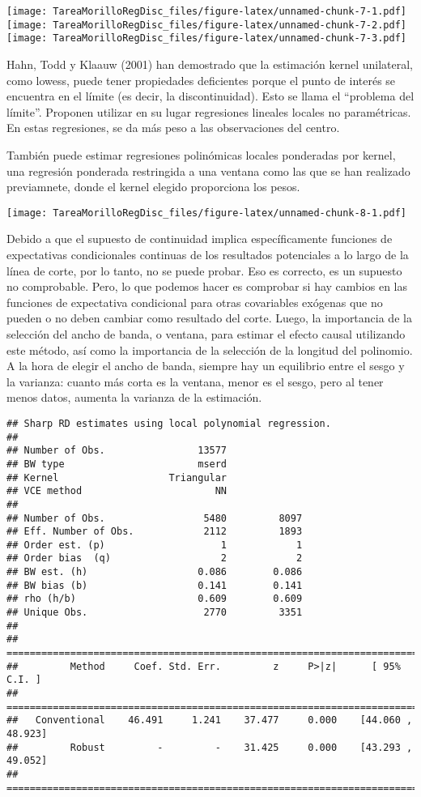 \documentclass[
]{article}
\begin{document}
\texttt{[image: TareaMorilloRegDisc\_files/figure-latex/unnamed-chunk-7-1.pdf]}
\texttt{[image: TareaMorilloRegDisc\_files/figure-latex/unnamed-chunk-7-2.pdf]}
\texttt{[image: TareaMorilloRegDisc\_files/figure-latex/unnamed-chunk-7-3.pdf]}

Hahn, Todd y Klaauw (2001) han demostrado que la estimación kernel
unilateral, como lowess, puede tener propiedades deficientes porque el
punto de interés se encuentra en el límite (es decir, la
discontinuidad). Esto se llama el ``problema del límite''. Proponen
utilizar en su lugar regresiones lineales locales no paramétricas. En
estas regresiones, se da más peso a las observaciones del centro.

También puede estimar regresiones polinómicas locales ponderadas por
kernel, una regresión ponderada restringida a una ventana como las que
se han realizado previamnete, donde el kernel elegido proporciona los
pesos.

\texttt{[image: TareaMorilloRegDisc\_files/figure-latex/unnamed-chunk-8-1.pdf]}

Debido a que el supuesto de continuidad implica específicamente
funciones de expectativas condicionales continuas de los resultados
potenciales a lo largo de la línea de corte, por lo tanto, no se puede
probar. Eso es correcto, es un supuesto no comprobable. Pero, lo que
podemos hacer es comprobar si hay cambios en las funciones de
expectativa condicional para otras covariables exógenas que no pueden o
no deben cambiar como resultado del corte. Luego, la importancia de la
selección del ancho de banda, o ventana, para estimar el efecto causal
utilizando este método, así como la importancia de la selección de la
longitud del polinomio. A la hora de elegir el ancho de banda, siempre
hay un equilibrio entre el sesgo y la varianza: cuanto más corta es la
ventana, menor es el sesgo, pero al tener menos datos, aumenta la
varianza de la estimación.

\begin{verbatim}
## Sharp RD estimates using local polynomial regression.
## 
## Number of Obs.                13577
## BW type                       mserd
## Kernel                   Triangular
## VCE method                       NN
## 
## Number of Obs.                 5480         8097
## Eff. Number of Obs.            2112         1893
## Order est. (p)                    1            1
## Order bias  (q)                   2            2
## BW est. (h)                   0.086        0.086
## BW bias (b)                   0.141        0.141
## rho (h/b)                     0.609        0.609
## Unique Obs.                    2770         3351
## 
## =============================================================================
##         Method     Coef. Std. Err.         z     P>|z|      [ 95% C.I. ]       
## =============================================================================
##   Conventional    46.491     1.241    37.477     0.000    [44.060 , 48.923]    
##         Robust         -         -    31.425     0.000    [43.293 , 49.052]    
## =============================================================================
\end{verbatim}
\end{document}
